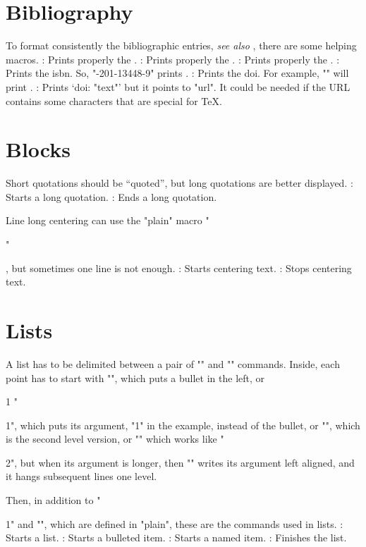 \section{Bibliography}

To format consistently the bibliographic entries,
{\em see also} ,
there are some helping macros.
\command{}: Prints properly the .
\command{}: Prints properly the .
\command{}: Prints properly the .
\command\ISBN: Prints the {\sc isbn}. So,
 "-201-13448-9" prints .
\command{}: Prints the {\sc doi}. For example,
 "" will print
  .
\command{}: Prints ‘{\sc doi}: "text"’
 but it points to "url". It could be needed if the
 URL contains some characters that are special for {\TeX}.


\section{Blocks}

Short quotations should be “quoted”,
but long quotations are better displayed.
\command\begincitation: Starts a long quotation.
\command\endcitation: Ends a long quotation.

Line long centering can use the
"plain" macro "\centerline",
but sometimes one line is not enough.
\command\begincenter: Starts centering text.
\command\endcenter: Stops centering text.


\section{Lists}

A list has to be delimited between a pair of
"\beginpoints" and "\endpoints" commands.
Inside, each point has to start with
\beginpoints
\point "\point", which puts a bullet in the left, or
 \item{1} "\item{1}", which puts its argument, "1" in the example,
 instead of the bullet, or
  "", which is the second level
 version, or
\point[2] "\point[2]" which works like "\item{2}", but
 when its argument is longer, then
 "" writes its
 argument left aligned, and it hangs subsequent lines
 one level.
\endpoints

Then, in addition to "\item{1}" and "",
which are defined in "plain",
these are the commands used in lists.
\command\beginpoints: Starts a list.
\command\point: Starts a bulleted item.
\command\point[Title]: Starts a named item.
\command\endpoints: Finishes the list.


